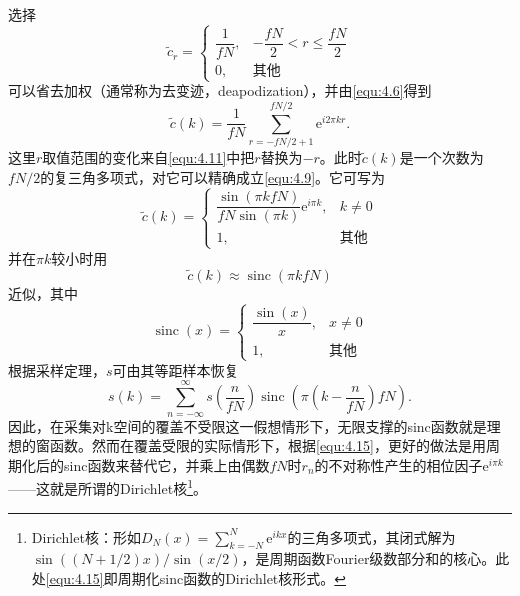 \documentclass[12pt]{article}
\let\originallautoref\autoref
\renewcommand{\autoref}[1]{\allowbreak\originallautoref{#1}}
\begin{document}
选择
\begin{equation}
    \tilde{c}_r=\begin{cases}
        \dfrac{1}{fN}, & -\dfrac{fN}{2}<r\le\dfrac{fN}{2}\\[2mm]
        0, & \text{其他}
    \end{cases}
    \label{equ:4.13}
\end{equation}
可以省去加权（通常称为去变迹，deapodization），并由\autoref{equ:4.6}得到
\begin{equation}
    \tilde{c}(k)=\frac{1}{fN}\sum_{r=-fN/2+1}^{fN/2}\mathrm{e}^{i2\pi kr}.
    \label{equ:4.14}
\end{equation}
这里$r$取值范围的变化来自\autoref{equ:4.11}中把$r$替换为$-r$。此时$\tilde{c}(k)$是一个次数为$fN/2$的复三角多项式，对它可以精确成立\autoref{equ:4.9}。它可写为
\begin{equation}
    \tilde{c}(k)=\begin{cases}
        \dfrac{\sin(\pi kfN)}{fN\sin(\pi k)}\mathrm{e}^{i\pi k}, & k\neq 0\\[2mm]
        1, & \text{其他}
    \end{cases}
    \label{equ:4.15}
\end{equation}
并在$\pi k$较小时用
\begin{equation}
    \tilde{c}(k)\approx\operatorname{sinc}(\pi kfN)
    \label{equ:4.16}
\end{equation}
近似，其中
\begin{equation}
    \operatorname{sinc}(x)=\begin{cases}
        \dfrac{\sin(x)}{x}, & x\neq 0\\[2mm]
        1, & \text{其他}
    \end{cases}
    \label{equ:4.17}
\end{equation}
根据采样定理，$s$可由其等距样本恢复
\begin{equation}
    s(k)=\sum_{n=-\infty}^{\infty}s\left(\frac{n}{fN}\right)\operatorname{sinc}\left(\pi\left(k-\frac{n}{fN}\right)fN\right).
    \label{equ:4.18}
\end{equation}
因此，在采集对k空间的覆盖不受限这一假想情形下，无限支撑的sinc函数就是理想的窗函数。然而在覆盖受限的实际情形下，根据\autoref{equ:4.15}，更好的做法是用周期化后的sinc函数来替代它，并乘上由偶数$fN$时$r_n$的不对称性产生的相位因子$\mathrm{e}^{i\pi k}$——这就是所谓的Dirichlet核\footnote{Dirichlet核：形如$D_N(x)=\sum_{k=-N}^{N}\mathrm{e}^{ikx}$的三角多项式，其闭式解为$\sin((N+1/2)x)/\sin(x/2)$，是周期函数Fourier级数部分和的核心。此处\autoref{equ:4.15}即周期化sinc函数的Dirichlet核形式。}。
\end{document}
